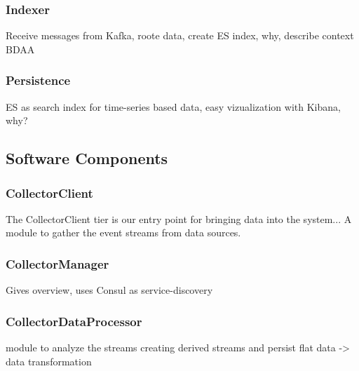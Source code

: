 \subsubsection{Indexer}

Receive messages from Kafka, roote data, create ES index, why, describe context BDAA

\subsubsection{Persistence}

ES as search index for time-series based data, easy vizualization with Kibana, why?

\subsection{Software Components}

\subsubsection{CollectorClient}

The CollectorClient tier is our entry point for bringing data into the system...
A module to gather the event streams from data sources.

\subsubsection{CollectorManager}

Gives overview, uses Consul as service-discovery

\subsubsection{CollectorDataProcessor}

module to analyze the streams creating derived streams and persist flat data -> data transformation


